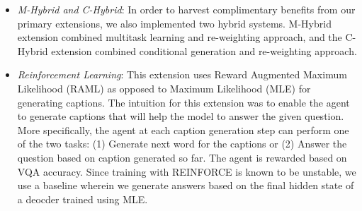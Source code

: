 \begin{itemize}
    
    \item \textit{M-Hybrid and C-Hybrid}: In order to harvest complimentary benefits from our primary extensions, we also implemented two hybrid systems. M-Hybrid extension combined multitask learning and re-weighting approach, and the C-Hybrid extension combined conditional generation and re-weighting approach.%
    
    \item \textit{Reinforcement Learning}: This extension uses Reward Augmented Maximum Likelihood (RAML) as opposed to Maximum Likelihood (MLE) for generating captions. The intuition for this extension was to enable the agent to generate captions that will help the model to answer the given question. More specifically, the agent at each caption generation step can perform one of the two tasks: (1) Generate next word for the captions or (2) Answer the question based on caption generated so far. The agent is rewarded based on VQA accuracy. Since training with REINFORCE is known to be unstable, we use a baseline wherein we generate answers based on the final hidden state of a deocder trained using MLE. %
    
    
\end{itemize}


